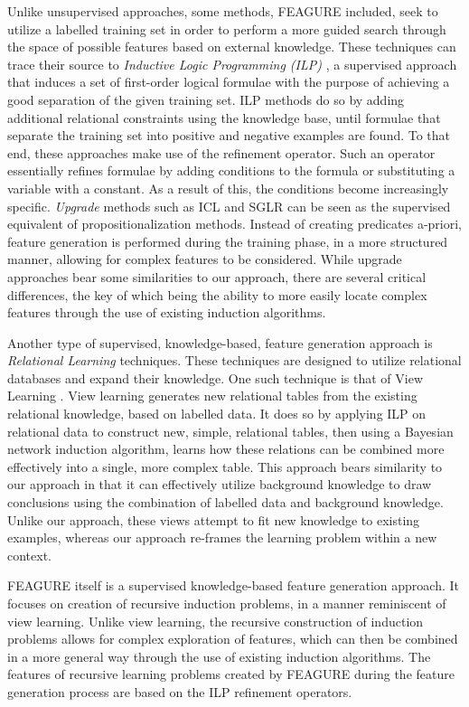 \documentclass[twoside,11pt]{article}
\theoremstyle{definition}
\begin{document}
Unlike unsupervised approaches, some methods, FEAGURE included, seek to utilize a labelled training set in order to perform a more guided search through the space of possible features based on external knowledge. 
These techniques can trace their source to \emph{Inductive Logic Programming (ILP)} \cite{quinlan1990learning,muggleton1991inductive}, a supervised approach that induces a set of first-order logical formulae with the purpose of achieving a good separation of the given training set. ILP methods do so by adding additional relational constraints using the knowledge base, until formulae that separate the training set into positive and negative examples are found. To that end, these approaches make use of the refinement operator. Such an operator essentially refines formulae by adding conditions to the formula or substituting a variable with a constant. As a result of this, the conditions become increasingly specific.
 \emph{Upgrade} methods such as ICL \cite{van2001upgrade} and SGLR \cite{popescul200716} can be seen as the supervised equivalent of propositionalization methods. Instead of creating predicates a-priori, feature generation is performed during the training phase, in a more structured manner, allowing for complex features to be considered.
 While upgrade approaches bear some similarities to our approach, there are several critical differences, the key of which being the ability to more easily locate complex features through the use of existing induction algorithms. 

Another type of supervised, knowledge-based, feature generation approach is \emph{Relational Learning} techniques. These techniques are designed to utilize relational databases and expand their knowledge. One such technique is that of View Learning . View learning generates new relational tables from the existing relational knowledge, based on labelled data.
It does so by applying ILP on relational data to construct new, simple, relational tables, then using a Bayesian network induction algorithm, learns how these relations can be combined more effectively into a single, more complex table.
This approach bears similarity to our approach in that it can effectively utilize background knowledge to draw conclusions using the combination of labelled data and background knowledge. Unlike our approach, these views attempt to fit new knowledge to existing examples, whereas our approach re-frames the learning problem within a new context.

FEAGURE itself is a supervised knowledge-based feature generation approach. It focuses on creation of recursive induction problems, in a manner reminiscent of view learning. Unlike view learning, the recursive construction of induction problems allows for complex exploration of features, which can then be combined in a more general way through the use of existing induction algorithms.
The features of recursive learning problems created by FEAGURE during the feature generation process are based on the ILP refinement operators.
\end{document}
